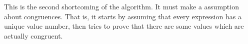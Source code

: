 This is the second shortcoming of the algorithm.  It must make a
 assumption about congruences.  That is, it starts by
assuming that every expression has a unique value number, then tries to prove
that there are some values which are actually congruent.


%
%
%
%
%
%
%
%
%
%
%
%
